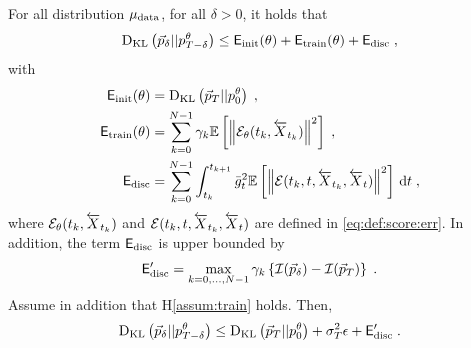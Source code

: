 \begin{theorem}\label{thm:KL_bound}
For all distribution $\mu_{\text{data}}$, for all $\delta >0$, it holds that  
\[
\operatorname{D}_{\operatorname{KL}}\left(\vec{ p}_{\delta}||p_{T-\delta}^{\theta}\right) \leq \mathsf{E}_{\operatorname{init}}(\theta) + \mathsf{E}_{\operatorname{train}}(\theta) + \mathsf{E}_{\operatorname{disc}} \;,
\]
with
\begin{align}
\mathsf{E}_{\operatorname{init}}(\theta)
&= \operatorname{D}_{\operatorname{KL}}\left(\vec{ p}_{T}||p_{0}^{\theta}\right) \;,\label{eq:err:mixVE}\\
\mathsf{E}_{\operatorname{train}}(\theta)&=
\sum_{k = 0}^{N-1} 
\gamma_k\mathbb{E} \left[\Big\|
\mathcal{E}_{\theta}(t_k,\overleftarrow{X}_{t_k})
\Big\|^2\right]
\label{eq:err:approxVE}\;,\\
\mathsf{E}_{\operatorname{disc}}&=
\sum_{k = 0}^{N-1} 
\int_{t_k}^{t_{k+1}} \bar{g}_t^2
\mathbb{E} \left[\Big\|
\mathcal{E}(t_k,t,\overleftarrow{X}_{t_k},\overleftarrow{X}_{t})
\Big\|^2\right] \, \mathrm{d}t \;,
\label{eq:err:discrVE}
\end{align}
where $\mathcal{E}_{\theta}(t_k,\overleftarrow{X}_{t_k}) $ and $\mathcal{E}(t_k,t,\overleftarrow{X}_{t_k},\overleftarrow{X}_{t})$ are defined in \eqref{eq:def:score:err}.
In addition, the term $\mathsf{E}_{\operatorname{disc}}$ is upper bounded by 
\begin{equation}\label{eq:information}
\mathsf{E}_{\operatorname{disc}}' = 
\max_{k = 0,\dots,N-1}  \gamma_k 
\left\{ \mathcal{I}(\vec{ p}_{\delta}) - \mathcal{I}(\vec{ p}_{T}) \right\}\;.
\end{equation}
Assume in addition that H\ref{assum:train} holds. Then,
\begin{equation}\label{eq:thm_simplified}
\operatorname{D}_{\operatorname{KL}}\left(\vec{ p}_{\delta}||p_{T-\delta}^{\theta}\right) 
\leq \operatorname{D}_{\operatorname{KL}}\left(\vec{ p}_{T}||p_{0}^{\theta}\right) 
+  \sigma_T^2 \epsilon  + \mathsf{E}_{\operatorname{disc}}' \;.
\end{equation}
\end{theorem}
